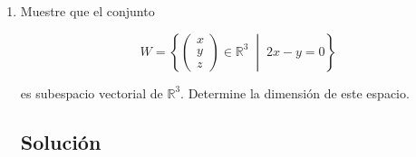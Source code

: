 \documentclass[a4paper]{article}
\begin{document}
\begin{enumerate}
\begin{itemize}
\item Una base del espacio vectorial es:
\[
\left\{
\begin{pmatrix} 0 & -1 \\ 1 & 1 \end{pmatrix},\ 
\begin{pmatrix} 0 & 1 \\ -2 & 3 \end{pmatrix},\ 
\begin{pmatrix} 0 & 3 \\ 1 & 4 \end{pmatrix}
\right\}
\]
\item La dimensión del espacio vectorial \(V\) es 3.
\end{itemize}
La matriz $\begin{pmatrix} 1 & 0 \\0 & 0 \end{pmatrix}$ no pertenece a $V$, pues haciendo la combinación lineal, se obtiene que 
\[
\begin{pmatrix} 1 & 0 \\0 & 0 \end{pmatrix}=\alpha
\begin{pmatrix} 0 & -1 \\ 1 & 1 \end{pmatrix}+\beta\ 
\begin{pmatrix} 0 & 1 \\ -2 & 3 \end{pmatrix}+\gamma\ 
\begin{pmatrix} 0 & 3 \\ 1 & 4 \end{pmatrix}
\]
resulta $1=0\alpha+0\beta+0\gamma=0$, lo cual es imposible.
\newpage


\item Muestre que el conjunto

\[
W = \left\{
\begin{pmatrix}
x \\
y \\
z
\end{pmatrix}
\in \mathbb{R}^3 \;\middle|\; 2x - y = 0
\right\}
\]

es subespacio vectorial de \(\mathbb{R}^3\). Determine la dimensión de este espacio.

\subsection*{Solución}


\end{enumerate}
\end{document}
